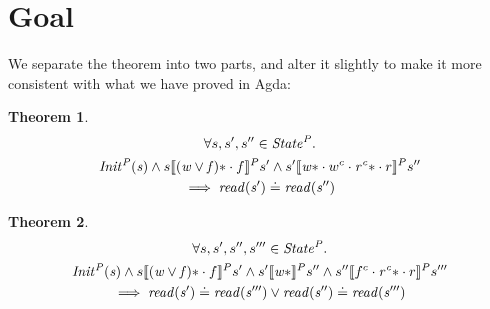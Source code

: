 \documentclass[a4paper,11pt]{article}
\newtheorem{theorem}{Theorem}[section]
\theoremstyle{definition}
\begin{document}
\section{Goal}

We separate the theorem into two parts, and alter it slightly to make it more consistent with what we have proved in Agda:

\begin{theorem}
\begin{multline*}
      \forall s, s', s'' \in \mathit{State^P} \ldotp\\\mathit{Init^P(s)} \land s \llbracket \mathit{(w \lor f)\ast} \cdot f \rrbracket^P s' \land s' \llbracket \mathit{w\ast} \cdot w^c \cdot \mathit{r^c\ast} \cdot r \rrbracket^P s'' \\ \implies \mathit{read(s')} \doteq \mathit{read(s'')}
\end{multline*}
\end{theorem}

\begin{theorem}
\begin{multline*}
      \forall s, s', s'', s''' \in \mathit{State^P} \ldotp\\\mathit{Init^P(s)} \land s \llbracket \mathit{(w \lor f)\ast} \cdot f \rrbracket^P s' \land
      s' \llbracket \mathit{w\ast} \rrbracket^P s'' \land
      s'' \llbracket f^c \cdot \mathit{r^c\ast} \cdot r \rrbracket^P s'''\\
      \implies \mathit{read(s')} \doteq \mathit{read(s''')} \lor \mathit{read(s'')} \doteq \mathit{read(s''')}
\end{multline*}
\end{theorem}
\end{document}
